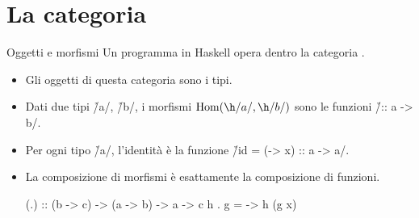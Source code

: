\section*{La categoria \protect\Hask{}}

\begin{frame}[fragile]{\secname}{Oggetti e morfismi}
Un programma in Haskell opera dentro la categoria \Hask{}.
\begin{itemize}[<+(1)->]
\item Gli oggetti di questa categoria sono i tipi.
\item Dati due tipi \h/a/, \h/b/, i morfismi $\Hom(\h/a/, \h/b/)$ sono le funzioni \h/:: a -> b/.
\item Per ogni tipo \h/a/, l'identità è la funzione \h/id = (\x -> x) :: a -> a/.
\item La composizione di morfismi è esattamente la composizione di funzioni.

\begin{haskellcode}
(.) :: (b -> c) -> (a -> b) -> a -> c
h . g = \x -> h (g x)
\end{haskellcode}

\end{itemize}
\end{frame} 

